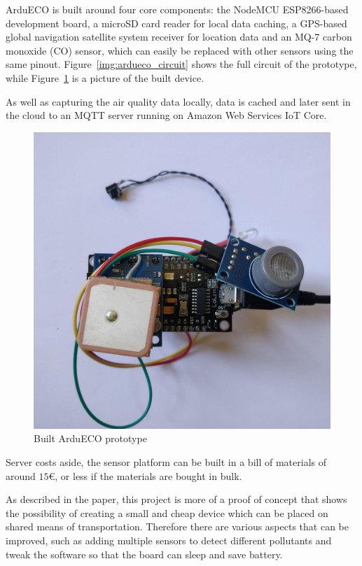 			ArduECO is built around four core components: the NodeMCU ESP8266-based development board, a microSD card reader for local data caching, a GPS-based global navigation satellite system receiver for location data and an MQ-7 carbon monoxide (CO) sensor, which can easily be replaced with other sensors using the same pinout.
			Figure~\ref{img:ardueco_circuit} shows the full circuit of the prototype, while Figure~\ref{img:ardueco_picture} is a picture of the built device.
			
			As well as capturing the air quality data locally, data is cached and later sent in the cloud to an MQTT server running on Amazon Web Services IoT Core.
			
			\noindent
			\begin{minipage}{0.38\textwidth}
				\begin{figure}[H]
					\centering
					\includegraphics[width=\textwidth]{resources/img/chap2/ardueco_picture}
					\caption{Built ArduECO prototype}
					\label{img:ardueco_picture}
				\end{figure}
			\end{minipage}%
			\hfill%
			\begin{minipage}{0.6\textwidth}\raggedright
				Server costs aside, the sensor platform can be built in a bill of materials of around $15$€, or less if the materials are bought in bulk.
				
				As described in the paper, this project is more of a proof of concept that shows the possibility of creating a small and cheap device which can be placed on shared means of transportation.
				Therefore there are various aspects that can be improved, such as adding multiple sensors to detect different pollutants and tweak the software so that the board can sleep and save battery.
			\end{minipage}

